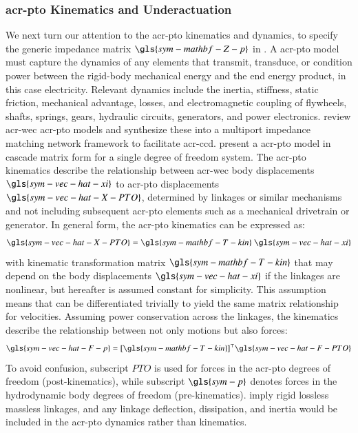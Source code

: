 \subsubsection{\gls{acr-pto} Kinematics and Underactuation}
We next turn our attention to the \gls{acr-pto} kinematics and dynamics, to specify the generic impedance matrix $\gls{sym-mathbf-Z-p}$ in .
A \gls{acr-pto} model must capture the dynamics of any elements that transmit, transduce, or condition power between the rigid-body mechanical energy and the end energy product, in this case electricity.
Relevant dynamics include the inertia, stiffness, static friction, mechanical advantage, losses, and electromagnetic coupling of flywheels, shafts, springs, gears, hydraulic circuits, generators, and power electronics.
\citet{penalba_review_2016} review \gls{acr-wec} \gls{acr-pto} models and \citet{coe_co-design_2025} synthesize these into a multiport impedance matching network framework to facilitate \gls{acr-ccd}.
\citet{coe_co-design_2025} present a \gls{acr-pto} model in cascade matrix form for a single degree of freedom system.
The \gls{acr-pto} kinematics describe the relationship between \gls{acr-wec} body displacements $\gls{sym-vec-hat-xi}$ to \gls{acr-pto} displacements $\gls{sym-vec-hat-X-PTO}$,
determined by linkages or similar mechanisms and not including subsequent \gls{acr-pto} elements such as a mechanical drivetrain or generator.
In general form, the \gls{acr-pto} kinematics can be expressed as:
\begin{equation}\label{eq:pto-kinematics-motion}
\gls{sym-vec-hat-X-PTO} = \gls{sym-mathbf-T-kin}~ \gls{sym-vec-hat-xi}
\end{equation}
with kinematic transformation matrix $\gls{sym-mathbf-T-kin}$ that may depend on the body displacements $\gls{sym-vec-hat-xi}$ if the linkages are nonlinear,
but hereafter is assumed constant for simplicity.
This assumption means that  can be differentiated trivially to yield the same matrix relationship for velocities.
Assuming power conservation across the linkages,
the kinematics describe the relationship between not only motions but also forces:
\begin{equation}\label{eq:pto-kinematics-force}
\gls{sym-vec-hat-F-p} = [\gls{sym-mathbf-T-kin}]^\top  \gls{sym-vec-hat-F-PTO}
\end{equation}
To avoid confusion, subscript $PTO$ is used for forces in the \gls{acr-pto} degrees of freedom (post-kinematics),
while subscript $\gls{sym-p}$ denotes forces in the hydrodynamic body degrees of freedom (pre-kinematics).
 imply rigid lossless massless linkages,
and any linkage deflection, dissipation, and inertia would be included in the \gls{acr-pto} dynamics rather than kinematics.

